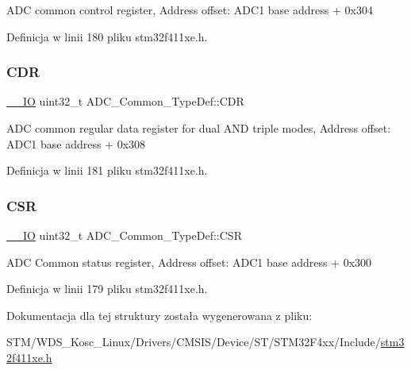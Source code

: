 A\+DC common control register, Address offset\+: A\+D\+C1 base address + 0x304 

Definicja w linii 180 pliku stm32f411xe.\+h.

\mbox{\label{struct_a_d_c___common___type_def_a6f7399bf70f677ef5de46a3038f414e1}} 
\subsubsection{\texorpdfstring{C\+DR}{CDR}}
{\footnotesize\ttfamily \hyperlink{core__sc300_8h_aec43007d9998a0a0e01faede4133d6be}{\+\_\+\+\_\+\+IO} uint32\+\_\+t A\+D\+C\+\_\+\+Common\+\_\+\+Type\+Def\+::\+C\+DR}

A\+DC common regular data register for dual A\+ND triple modes, Address offset\+: A\+D\+C1 base address + 0x308 

Definicja w linii 181 pliku stm32f411xe.\+h.

\mbox{\label{struct_a_d_c___common___type_def_ac38e24f600f9e134a54a0c43b976a4f4}} 
\subsubsection{\texorpdfstring{C\+SR}{CSR}}
{\footnotesize\ttfamily \hyperlink{core__sc300_8h_aec43007d9998a0a0e01faede4133d6be}{\+\_\+\+\_\+\+IO} uint32\+\_\+t A\+D\+C\+\_\+\+Common\+\_\+\+Type\+Def\+::\+C\+SR}

A\+DC Common status register, Address offset\+: A\+D\+C1 base address + 0x300 

Definicja w linii 179 pliku stm32f411xe.\+h.



Dokumentacja dla tej struktury została wygenerowana z pliku\+:\begin{DoxyCompactItemize}
\item 
S\+T\+M/\+W\+D\+S\+\_\+\+Kosc\+\_\+\+Linux/\+Drivers/\+C\+M\+S\+I\+S/\+Device/\+S\+T/\+S\+T\+M32\+F4xx/\+Include/\hyperlink{stm32f411xe_8h}{stm32f411xe.\+h}\end{DoxyCompactItemize}
